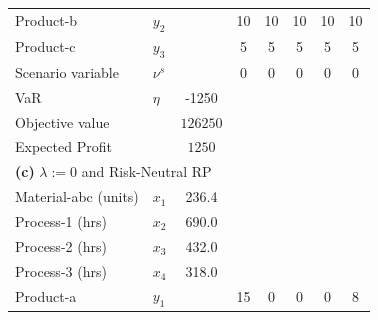 \documentclass[7pt]{article}
\begin{document}
\begin{table}[h!]
\begin{tabular}{ll|c|ccccc}
        Product-b             & $y_2$                                      &                 & 10           & 10                & 10            & 10               & 10            \\
        Product-c             & $y_3$                                      &                 & 5            & 5                 & 5             & 5                & 5             \\
        Scenario variable     & $\nu^s$                                    &                 & 0            & 0                 & 0             & 0                & 0             \\
        VaR                   & $\eta$                                     & -1250           &              &                   &               &                  &               \\
        Objective value       &                                            & $126250$        &                                                                                     \\
        Expected Profit       &                                            & $1250$          &                                                                                     \\
        \midrule
        \multicolumn{8}{l}{\textbf{(c)} $\lambda := 0$ and Risk-Neutral RP}                                                                                                        \\
        \midrule
        Material-abc (units)  & $x_1$                                      & 236.4           &              &                   &               &                  &               \\
        Process-1 (hrs)       & $x_2$                                      & 690.0           &              &                   &               &                  &               \\
        Process-2 (hrs)       & $x_3$                                      & 432.0           &              &                   &               &                  &               \\
        Process-3 (hrs)       & $x_4$                                      & 318.0           &              &                   &               &                  &               \\
        Product-a             & $y_1$                                      &                 & 15           & 0                 & 0             & 0                & 8             \\

\end{tabular}
\end{table}
\end{document}
